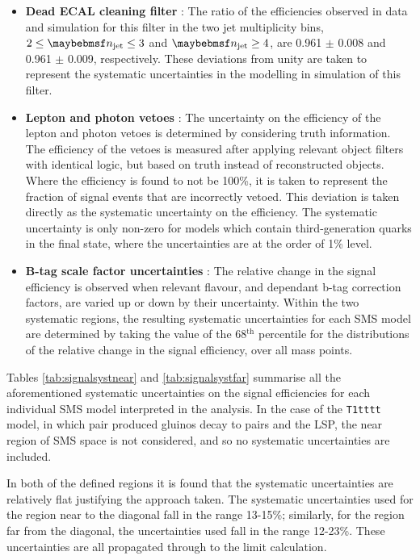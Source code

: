 \begin{itemize}
\item[]\textbf{Dead ECAL cleaning filter} :
The ratio of the efficiencies observed in data and simulation for this filter in the two jet multiplicity bins, $2 \leq \njet \leq 3$ and $\njet \geq 4$, are 0.961 $\pm$ 0.008 and 0.961 $\pm$ 0.009, respectively. These deviations from unity are taken to represent the systematic uncertainties in the modelling in simulation of this filter.
\item[]\textbf{Lepton and photon vetoes} :
The uncertainty on the efficiency of the lepton and photon vetoes is determined by considering truth information. The efficiency of the vetoes is measured after applying relevant object filters with identical logic, but based on truth instead of reconstructed objects. Where the efficiency is found to not be 100\%, it is taken to represent the fraction of signal events that are incorrectly vetoed. This deviation is taken directly as the systematic uncertainty on the efficiency. The systematic uncertainty is only non-zero for models which contain third-generation quarks in the final state, where the uncertainties are at the order of 1\% level.
\item[]\textbf{B-tag scale factor uncertainties} :
The relative change in the signal efficiency is observed when relevant flavour, \pt and \eta dependant b-tag correction factors, are varied up or down by their uncertainty. Within the two systematic regions, the resulting systematic uncertainties for each \ac{SMS} model are determined by taking the value of the 68$^{\text{th}}$ percentile for the distributions of the relative change in the signal efficiency, over all mass points.
\end{itemize}

Tables \ref{tab:signalsystnear} and \ref{tab:signalsystfar} summarise all the aforementioned systematic uncertainties on the signal efficiencies for each individual \ac{SMS} model interpreted in the analysis. In the case of the \texttt{T1tttt} model, in which pair produced gluinos decay to \ttbar pairs and the \ac{LSP}, the near region of \ac{SMS} space is not considered, and so no systematic uncertainties are included.

In both of the defined regions it is found that the systematic uncertainties are relatively flat justifying the approach taken. The systematic uncertainties used for the region near to the diagonal fall in the range 13-15\%; similarly, for the region far from the diagonal, the uncertainties used fall in the range 12-23\%. These uncertainties are all propagated through to the limit calculation.

